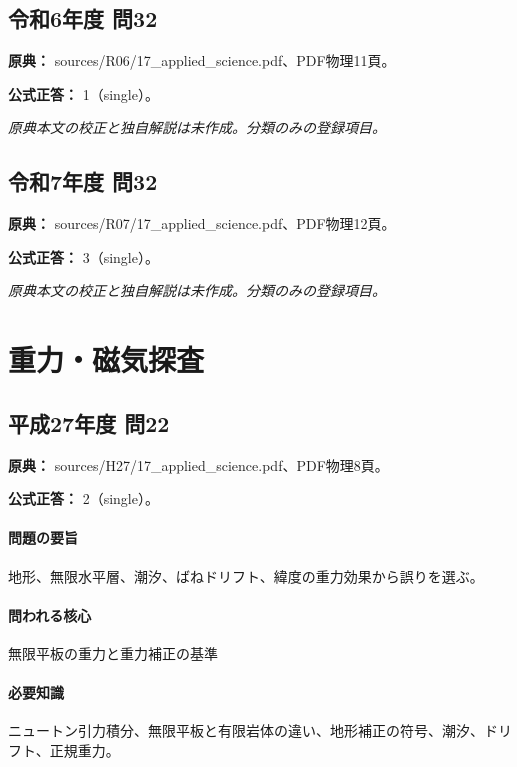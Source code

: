 \subsection{令和6年度 問32}
\label{q:r06-reg-applied-32}

\noindent\textbf{原典：} sources/R06/17\_applied\_science.pdf、PDF物理11頁。

\textbf{公式正答：} 1（single）。

\par\textit{原典本文の校正と独自解説は未作成。分類のみの登録項目。}

\subsection{令和7年度 問32}
\label{q:r07-reg-applied-32}

\noindent\textbf{原典：} sources/R07/17\_applied\_science.pdf、PDF物理12頁。

\textbf{公式正答：} 3（single）。

\par\textit{原典本文の校正と独自解説は未作成。分類のみの登録項目。}

\section{重力・磁気探査}

\subsection{平成27年度 問22}
\label{q:h27-reg-applied-22}

\noindent\textbf{原典：} sources/H27/17\_applied\_science.pdf、PDF物理8頁。

\textbf{公式正答：} 2（single）。

\paragraph{問題の要旨} 地形、無限水平層、潮汐、ばねドリフト、緯度の重力効果から誤りを選ぶ。

\paragraph{問われる核心} 無限平板の重力と重力補正の基準

\paragraph{必要知識} ニュートン引力積分、無限平板と有限岩体の違い、地形補正の符号、潮汐、ドリフト、正規重力。

